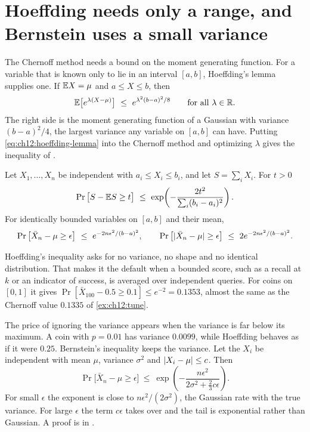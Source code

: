 \section{Hoeffding needs only a range, and Bernstein uses a small variance}\label{sec:ch12:hoeffding}

The Chernoff method needs a bound on the moment generating function. For a variable that is known only to lie in an interval $[a,b]$, Hoeffding's lemma supplies one. If $\mathbb{E} X=\mu$ and $a\le X\le b$, then
\begin{equation}
\E\big[e^{\lambda(X-\mu)}\big]\ \le\ e^{\lambda^2(b-a)^2/8}\qquad\text{for all }\lambda\in\R.
\label{eq:ch12:hoeffding-lemma}
\end{equation}
The right side is the moment generating function of a Gaussian with variance $(b-a)^2/4$, the largest variance any variable on $[a,b]$ can have. Putting \cref{eq:ch12:hoeffding-lemma} into the Chernoff method and optimizing $\lambda$ gives the inequality of \citet{hoeffding1963}.

\begin{theorem}[Hoeffding]\label{thm:ch12:hoeffding}
Let $X_1,\dots,X_n$ be independent with $a_i\le X_i\le b_i$, and let $S=\sum_iX_i$. For $t>0$
\begin{equation}
\Pr\big[S-\E S\ge t\big]\ \le\ \exp\!\left(-\frac{2t^2}{\sum_i(b_i-a_i)^2}\right).
\label{eq:ch12:hoeffding}
\end{equation}
For identically bounded variables on $[a,b]$ and their mean,
\begin{equation}
\Pr\big[\bar X_n-\mu\ge\epsilon\big]\ \le\ e^{-2n\epsilon^2/(b-a)^2},
\qquad
\Pr\big[\abs{\bar X_n-\mu}\ge\epsilon\big]\ \le\ 2e^{-2n\epsilon^2/(b-a)^2}.
\label{eq:ch12:hoeffding-mean}
\end{equation}
\end{theorem}

Hoeffding's inequality asks for no variance, no shape and no identical distribution. That makes it the default when a bounded score, such as a recall at $k$ or an indicator of success, is averaged over independent queries. For coins on $[0,1]$ it gives $\Pr[\bar X_{100}-0.5\ge0.1]\le e^{-2}=0.1353$, almost the same as the Chernoff value $0.1335$ of \cref{ex:ch12:tune}.

The price of ignoring the variance appears when the variance is far below its maximum. A coin with $p=0.01$ has variance $0.0099$, while Hoeffding behaves as if it were $0.25$. Bernstein's inequality keeps the variance. Let the $X_i$ be independent with mean $\mu$, variance $\sigma^2$ and $\lvert X_i-\mu\rvert\le c$. Then
\begin{equation}
\Pr\big[\bar X_n-\mu\ge\epsilon\big]\ \le\ \exp\!\left(-\frac{n\epsilon^2}{2\sigma^2+\tfrac23c\epsilon}\right).
\label{eq:ch12:bernstein}
\end{equation}
For small $\epsilon$ the exponent is close to $n\epsilon^2/(2\sigma^2)$, the Gaussian rate with the true variance. For large $\epsilon$ the term $c\epsilon$ takes over and the tail is exponential rather than Gaussian. A proof is in \citet{boucheron2013}.

